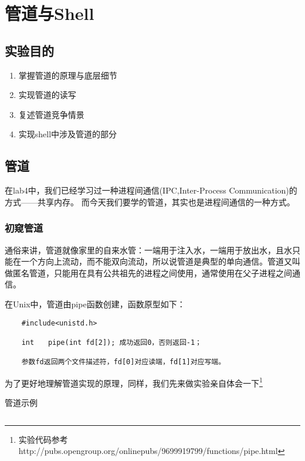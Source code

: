 \chapter{管道与Shell}
\section{实验目的}
\begin{enumerate}
	\item 掌握管道的原理与底层细节
	\item 实现管道的读写
	\item 复述管道竞争情景
	\item 实现shell中涉及管道的部分
\end{enumerate}

\section{管道}

在lab4中，我们已经学习过一种进程间通信(IPC,Inter-Process Communication)的方式——共享内存。
而今天我们要学的管道，其实也是进程间通信的一种方式。

\subsection{初窥管道}

通俗来讲，管道就像家里的自来水管：一端用于注入水，一端用于放出水，且水只能在一个方向上流动，而不能双向流动，所以说管道是典型的单向通信。管道又叫做匿名管道，只能用在具有公共祖先的进程之间使用，通常使用在父子进程之间通信。
 
在Unix中，管道由pipe函数创建，函数原型如下：

\begin{verbatim}
	#include<unistd.h>
	
	int　　pipe(int fd[2]); 成功返回0，否则返回-1；
	
	参数fd返回两个文件描述符，fd[0]对应读端，fd[1]对应写端。
\end{verbatim}

为了更好地理解管道实现的原理，同样，我们先来做实验亲自体会一下\footnote{实验代码参考 http://pubs.opengroup.org/onlinepubs/9699919799/functions/pipe.html}

\begin{codeBoxWithCaption}{管道示例\label{code:test_pipe.c}}
	\inputminted[linenos]{c}{codes/test_pipe.c}
\end{codeBoxWithCaption}

